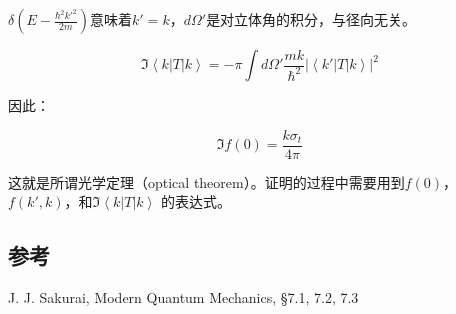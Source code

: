 $\delta(E - \frac{\hbar^2 k'^2}{2m})$意味着$k' = k$，$d \Omega'$是对立体角的积分，与径向无关。

\begin{equation}
\Im  \left\langle k \right| T \left| k \right\rangle = - \pi \int d \Omega' \frac{mk}{\hbar^2}  | \left\langle  k' | T | k \right\rangle  |^2
\end{equation}

因此：

\begin{equation}
\Im f(0) = \frac{ k \sigma_t}{4 \pi }
\end{equation}

这就是所谓光学定理（optical theorem）。证明的过程中需要用到$f(0)$，$f(k',k)$，和$\Im \left\langle k \right| T \left| k \right\rangle $ 的表达式。


\subsection*{参考}

J. J. Sakurai, Modern Quantum Mechanics, \S 7.1, 7.2, 7.3